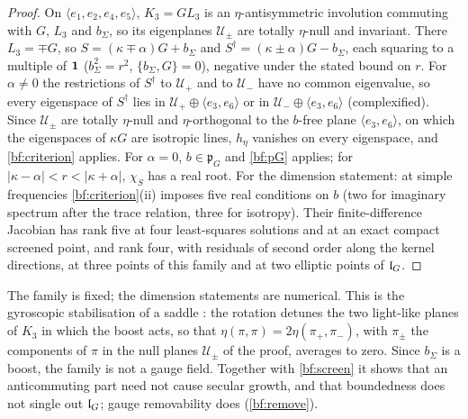 \begin{proof}
On $\langle e_1,e_2,e_4,e_5\rangle$, $K_3=GL_3$ is an $\eta$-antisymmetric involution commuting with $G$, $L_3$ and $b_\Sigma$, so its eigenplanes
$\mathcal U_\pm$ are totally $\eta$-null and invariant. There $L_3=\mp G$, so $S=(\kappa\mp\alpha)G+b_\Sigma$ and $S^\dagger=(\kappa\pm\alpha)G-b_\Sigma$, each
squaring to a multiple of $\mathbf 1$ ($b_\Sigma^2=r^2$, $\{b_\Sigma,G\}=0$), negative under the stated bound on $r$. For $\alpha\neq0$ the restrictions of
$S^\dagger$ to $\mathcal U_+$ and to $\mathcal U_-$ have no common eigenvalue, so every eigenspace of $S^\dagger$ lies in $\mathcal U_+\oplus\langle e_3,e_6\rangle$ or in
$\mathcal U_-\oplus\langle e_3,e_6\rangle$ (complexified). Since $\mathcal U_\pm$ are totally $\eta$-null and $\eta$-orthogonal to the $b$-free plane
$\langle e_3,e_6\rangle$, on which the eigenspaces of $\kappa G$ are isotropic lines, $h_\eta$ vanishes on every eigenspace, and \cref{bf:criterion}
applies. For $\alpha=0$, $b\in\mathfrak p_G$ and
\cref{bf:pG} applies; for $|\kappa-\alpha|<r<|\kappa+\alpha|$, $\chi_S$ has a real root. For the dimension statement: at simple frequencies
\cref{bf:criterion}(ii) imposes five real conditions on $b$ (two for imaginary spectrum after the trace relation, three for isotropy). Their
finite-difference Jacobian has rank five at four least-squares solutions and at an exact compact screened point, and rank four, with residuals of
second order along the kernel directions, at three points of this family and at two elliptic points of $\mathfrak l_G$.
\end{proof}

The family is fixed; the dimension statements are numerical. This is the gyroscopic stabilisation of a saddle
\cite{ThomsonTait1879,Kirillov2013}: the rotation detunes the two light-like planes of $K_3$ in which the boost acts, so that
$\eta(\pi,\pi)=2\eta(\pi_+,\pi_-)$, with $\pi_\pm$ the components of $\pi$ in the null planes $\mathcal U_\pm$ of the proof, averages to zero. Since $b_\Sigma$ is a boost, the family is not a gauge field. Together with \cref{bf:screen} it
shows that an anticommuting part need not cause secular growth, and that boundedness does not single out $\mathfrak l_G$; gauge removability does
(\cref{bf:remove}).

